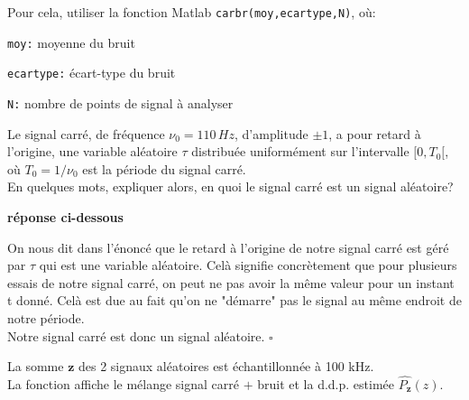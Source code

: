 \documentclass{article}
\newcommand{\debutrep}[1]{\color{blue}\begin{center} \hrulefill \textbf{ #1 } \hrulefill \end{center} }
\newcommand{\finrep}{\vspace*{5mm}\hfill $\square$\color{black}\vspace*{5mm}}
\begin{document}
Pour cela, utiliser la fonction Matlab {\tt carbr(moy,ecartype,N)}, où:
\begin{list}{}{\setlength{\leftmargin}{20mm} \setlength{\labelwidth}{20mm} \setlength{\labelsep}{3mm} \setlength{\itemsep}{1mm} }
\item[{\tt moy:}] moyenne du bruit
\item[{\tt ecartype:}] écart-type du bruit
\item[{\tt N:}] nombre de points de signal à analyser
\end{list}

Le signal carré, de fréquence $\nu_0=110\,Hz$, d'amplitude $\pm 1$, a pour  retard à l'origine, une variable aléatoire $\tau$ distribuée uniformément sur l'intervalle $[0,T_0[$, où $T_0=1/\nu_0$ est la période du signal carré. \\

En quelques mots, expliquer alors, en quoi le signal carré est un signal aléatoire? \\

\debutrep{réponse ci-dessous}
On nous dit dans l'énoncé que le retard à l'origine de notre signal carré est géré par $\tau$ qui est une variable aléatoire. Celà signifie concrètement que pour plusieurs essais de notre signal carré, on peut ne pas avoir la même valeur pour un instant t donné. Celà est due au fait qu'on ne "démarre" pas le signal au même endroit de notre période.\\Notre signal carré est donc un signal aléatoire.
\finrep


La somme $\mathbf{z}$ des 2 signaux aléatoires est échantillonnée à 100 kHz. \\
La fonction affiche le mélange signal carré $+$ bruit et la d.d.p. estimée $\widehat{P_{\mathbf{z}}}(z)$.\\
\end{document}
